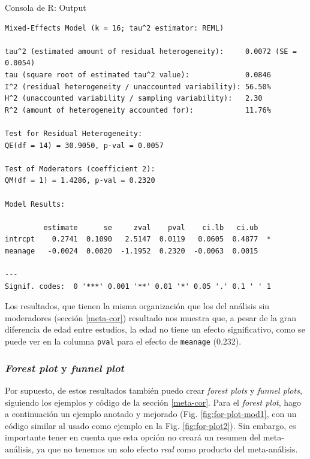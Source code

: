 \documentclass[
  bookmarksnumbered]{article}
\begin{document}
\begin{ROut}{Consola de R: Output~\thetcbcounter}
                \begin{footnotesize}
                \begin{verbatim} 
Mixed-Effects Model (k = 16; tau^2 estimator: REML)

tau^2 (estimated amount of residual heterogeneity):     0.0072 (SE = 0.0054)
tau (square root of estimated tau^2 value):             0.0846
I^2 (residual heterogeneity / unaccounted variability): 56.50%
H^2 (unaccounted variability / sampling variability):   2.30
R^2 (amount of heterogeneity accounted for):            11.76%

Test for Residual Heterogeneity:
QE(df = 14) = 30.9050, p-val = 0.0057

Test of Moderators (coefficient 2):
QM(df = 1) = 1.4286, p-val = 0.2320

Model Results:

         estimate      se     zval    pval    ci.lb   ci.ub 
intrcpt    0.2741  0.1090   2.5147  0.0119   0.0605  0.4877  * 
meanage   -0.0024  0.0020  -1.1952  0.2320  -0.0063  0.0015    

---
Signif. codes:  0 '***' 0.001 '**' 0.01 '*' 0.05 '.' 0.1 ' ' 1
 \end{verbatim}
                \end{footnotesize}
                \end{ROut}

Los resultados, que tienen la misma organización que los del análisis sin moderadores (sección \ref{meta-cor}) resultado nos muestra que, a pesar de la gran diferencia de edad entre estudios, la edad no tiene un efecto significativo, como se puede ver en la columna \texttt{pval} para el efecto de \texttt{meanage} (0.232).

\hypertarget{plot-mod}{%
\subsubsection{\texorpdfstring{\emph{Forest plot} y \emph{funnel plot}}{Forest plot y funnel plot}}\label{plot-mod}}

Por supuesto, de estos resultados también puedo crear \emph{forest plots} y \emph{funnel plots}, siguiendo los ejemplos y código de la sección \ref{meta-cor}. Para el \emph{forest plot}, hago a continuación un ejemplo anotado y mejorado (Fig. \ref{fig:for-plot-mod1}, con un código similar al usado como ejemplo en la Fig. \ref{fig:for-plot2}). Sin embargo, es importante tener en cuenta que esta opción no creará un resumen del meta-análisis, ya que no tenemos un solo efecto \emph{real} como producto del meta-análisis.
\end{document}

